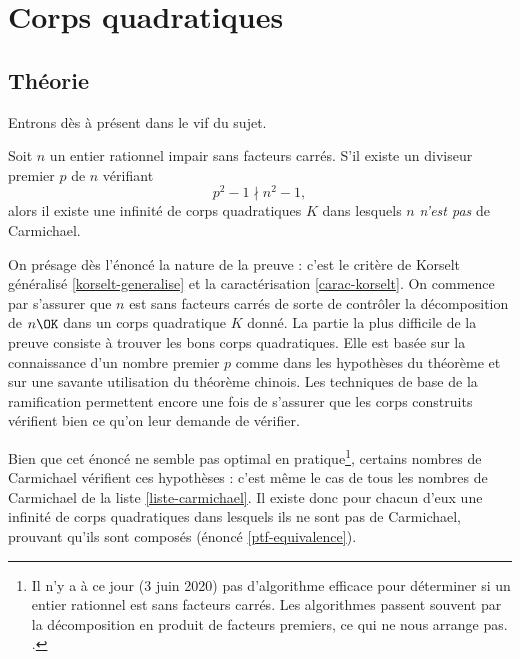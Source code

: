 \section{Corps quadratiques}

\subsection{Théorie}

Entrons dès à présent dans le vif du sujet. 

\begin{theoreme}\label{theoreme-2.5}
	Soit $n$ un entier rationnel impair sans facteurs carrés. S'il existe un diviseur premier $p$ de $n$ vérifiant $$p^2 - 1 \nmid n^2 - 1,$$ alors il existe une infinité de corps quadratiques $K$ dans lesquels $n$ \emph{n'est pas} de Carmichael.
\end{theoreme}

\begin{MotSurPreuve}
	On présage dès l'énoncé la nature de la preuve : c'est le critère de Korselt généralisé \ref{korselt-generalise} et la caractérisation \ref{carac-korselt}. On commence par s'assurer que $n$ est sans facteurs carrés de sorte de contrôler la décomposition de $n\OK$ dans un corps quadratique $K$ donné. La partie la plus difficile de la preuve consiste à trouver les bons corps quadratiques. Elle est basée sur la connaissance d'un nombre premier $p$ comme dans les hypothèses du théorème et sur une savante utilisation du théorème chinois. Les techniques de base de la ramification permettent encore une fois de s'assurer que les corps construits vérifient bien ce qu'on leur demande de vérifier. \\
\end{MotSurPreuve}

Bien que cet énoncé ne semble pas optimal en pratique\footnote{Il n'y a à ce jour (3 juin 2020) pas d'algorithme efficace pour déterminer si un entier rationnel est sans facteurs carrés. Les algorithmes passent souvent par la décomposition en produit de facteurs premiers, ce qui ne nous arrange pas. .}, certains nombres de Carmichael vérifient ces hypothèses : c'est même le cas de tous les nombres de Carmichael de la liste \ref{liste-carmichael}. Il existe donc pour chacun d'eux une infinité de corps quadratiques dans lesquels ils ne sont pas de Carmichael, prouvant qu'ils sont composés (énoncé \ref{ptf-equivalence}). \\

